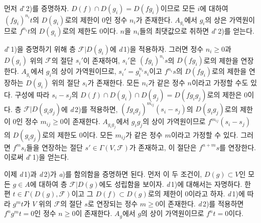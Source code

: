 먼저 \textit{d}'\,2)를 증명하자. $D(f)\cap D(g_i)=D(fg_i)$이므로
모든 $i$에 대하여 $(fg_i)^{n_i}t$의 $D(g_i)$로의 제한이 $0$인
정수 $n_i$가 존재한다. $A_{g_i}$에서 $g_i$의 상은 가역원이므로
$f^{n_i}t$의 $D(g_i)$로의 제한도 $0$이다. $n$을 $n_i$들의
최댓값으로 취하면 \textit{d}'\,2)를 얻는다.

\textit{d}'\,1)을 증명하기 위해 층 $\mathscr{F}|D(g_i)$에
\textit{d}\,1)을 적용하자. 그러면 정수 $n_i\geq0$과
$D(g_i)$ 위의 $\mathscr{F}$의 절단 $s_i'$이 존재하여,
$s_i'$은 $(fg_i)^{n_i}s$의 $D(fg_i)$로의 제한을 연장한다.
$A_{g_i}$에서 $g_i$의 상이 가역원이므로, $s_i'=g_i^{n_i}s_i$이고
$f^{n_i}s$의 $D(fg_i)$로의 제한을 연장하는 $D(g_i)$ 위의 절단
$s_i$가 존재한다. 모든 $n_i$가 같은 정수 $n$이라고 가정할 수도
있다. 구성에 따라 $s_i-s_j$의
$D(f)\cap D(g_i)\cap D(g_j)=D(fg_i g_j)$로의 제한은 $0$이다.
층 $\mathscr{F}|D(g_i g_j)$에 \textit{d}\,2)를 적용하면,
$(fg_i g_j)^{m_{ij}}(s_i-s_j)$의 $D(g_i g_j)$로의 제한이 $0$인
정수 $m_{ij}\geq0$이 존재한다. $A_{g_i g_j}$에서 $g_i g_j$의 상이
가역원이므로 $f^{m_{ij}}(s_i-s_j)$의 $D(g_i g_j)$로의 제한도
$0$이다. 모든 $m_{ij}$가 같은 정수 $m$이라고 가정할 수 있다.
그러면 $f^m s_i$들을 연장하는 절단
$s'\in\Gamma(V,\mathscr{F})$가 존재하고, 이 절단은
$f^{n+m}s$를 연장한다. 이로써 \textit{d}'\,1)을 얻는다.

이제 \textit{d}\,1)과 \textit{d}\,2)가 \textit{a})를
함의함을 증명하면 된다. 먼저 이 두 조건이, $D(g)\subset V$인 모든
$g\in A$에 대하여 층 $\mathscr{F}|D(g)$에도 성립함을 보이자.
\textit{d}\,1)에 대해서는 자명하다. 한편
$t\in\Gamma(D(g),\mathscr{F})$이고 그 $D(f)\subset D(g)$로의
제한이 $0$이라고 하자. \textit{d}\,1)에 따라 $g^m t$가 $V$ 위의
$\mathscr{F}$의 절단 $s$로 연장되는 정수 $m\geq0$이 존재한다.
\textit{d}\,2)를 적용하면 $f^n g^m t=0$인 정수 $n\geq0$이
존재한다. $A_g$에서 $g$의 상이 가역원이므로 $f^n t=0$이다.

